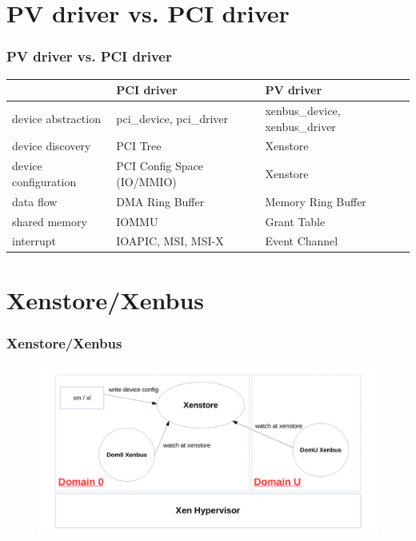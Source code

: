 \documentclass[aspectratio=169]{beamer}
\begin{document}

\section{PV driver vs. PCI driver}
\begin{frame}
\frametitle{PV driver vs. PCI driver}
\begin{table}
\small
\begin{tabular}{l l l}
\toprule
& \textbf{PCI driver} & \textbf{PV driver}\\
\midrule
device abstraction & pci\_device, pci\_driver & xenbus\_device, xenbus\_driver \\
device discovery & PCI Tree & Xenstore \\
device configuration & PCI Config Space (IO/MMIO) & Xenstore \\
data flow & DMA Ring Buffer & Memory Ring Buffer \\
shared memory & IOMMU & Grant Table \\
interrupt & IOAPIC, MSI, MSI-X & Event Channel \\
\bottomrule
\end{tabular}
\end{table}
\end{frame}


\section{Xenstore/Xenbus}
\begin{frame}
\frametitle{Xenstore/Xenbus}
\begin{figure}
\includegraphics[width=1.0\linewidth]{figures/xenstore.pdf}
\end{figure}
\end{frame}
\end{document}
